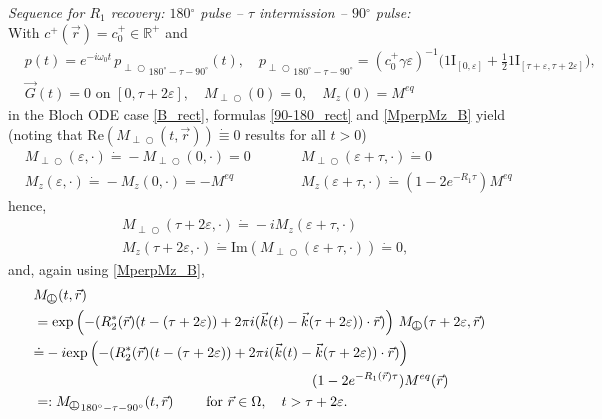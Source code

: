 \documentclass{ws-m3as}
\renewcommand\Re{\mathrm{Re}}
\renewcommand\Im{\mathrm{Im}}
\def\Mpp{M_{\perp\!\!\!\!\!\bigcirc}}
\def\pp{p_{\perp\!\!\!\!\!\bigcirc}}
\newcommand\taup{\varepsilon}
\newcommand{\eexp}[1]{\text{exp}\left(#1\right)}
\begin{document}
\noindent
\textit{Sequence for $R_1$ recovery: $180{}^{\circ}$ pulse -- $\tau$ intermission -- $90{}^{\circ}$ pulse:}\\[1ex]
With $c^+(\vec r)=c^+_0\in\mathbb{R}^+$ and
\begin{equation}\label{180-tau-90_rect}
\begin{aligned}
&p(t)= e^{-i\omega_0t}\, {\pp}_{180^\circ-\tau-90^\circ}(t), \quad 
{\pp}_{180^\circ-\tau-90^\circ}=(c^+_0\gamma\taup)^{-1}\bigl(1\!\mathrm{I}_{[0,\taup]} + \frac12 1\!\mathrm{I}_{[\tau+\taup,\tau+2\taup]}\bigr),\\  
&\vec{G}(t)=0\text{ on } [0,\tau+2\taup],\quad
\Mpp(0)=0, \quad M_z(0)=M^{eq}
\end{aligned}
\end{equation}
in the Bloch ODE case \eqref{B_rect}, formulas \eqref{90-180_rect} and \eqref{MperpMz_B} yield
(noting that $\Re({\Mpp}(t,\vec r))\dot{\equiv}0$ results for all $t>0$)
\begin{equation}\label{init180tau90eps}
\begin{aligned}
&\Mpp(\taup,\cdot)\dot{=}-\Mpp(0,\cdot)=0\qquad
&&\Mpp(\taup+\tau,\cdot)\dot{=}0\qquad\\
&M_z(\taup,\cdot)\dot{=}-M_z(0,\cdot)=-M^{eq}
&&M_z(\taup+\tau,\cdot)\dot{=}(1-2e^{-R_1\tau})M^{eq}
\end{aligned}
\end{equation}
hence, 
\begin{equation}\label{init180tau90tauplus2eps}
\begin{aligned}
&\Mpp(\tau+2\taup,\cdot)\dot{=}-iM_z(\taup+\tau,\cdot)%
\\
&M_z(\tau+2\taup,\cdot)\dot{=}\Im(\Mpp(\taup+\tau,\cdot))\dot{=}0,
\end{aligned}
\end{equation}
and, again using \eqref{MperpMz_B},
\begin{equation}\label{Mperp_ex_180-tau-90_rect_B}
\begin{aligned}
&\Mpp(t,\vec r)\\
&= 
\eexp{-(R_2^*(\vec r)(t-(\tau+2\taup))+2\pi i ({\vec k}(t)-{\vec k}(\tau+2\taup))\cdot{\vec r})}
\,\Mpp(\tau+2\taup,\vec r)
\\
&\dot{=} 
-i\eexp{-(R_2^*(\vec r)(t-(\tau+2\taup))+2\pi i ({\vec k}(t)-{\vec k}(\tau+2\taup))\cdot{\vec r})}\,
\\&\hspace*{7cm}
(1-2e^{-R_1(\vec r)\tau})M^{eq}(\vec r)\\
&=:{\Mpp}_{180^\circ-\tau-90^\circ}(t,\vec r)\qquad
\text{ for }\vec r\in\Omega, \quad t>\tau+2\taup.
\end{aligned}
\end{equation}
\end{document}
